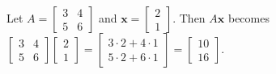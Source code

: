 \documentclass[preview]{standalone}
\begin{document}
\begin{center}
Let $A = \begin{bmatrix} 3 & 4 \\ 5 & 6 \end{bmatrix}$ and $\mathbf{x} = \begin{bmatrix} 2 \\ 1 \end{bmatrix}.$ Then $A\mathbf{x}$ becomes \\ $\begin{bmatrix} 3 & 4 \\ 5 & 6 \end{bmatrix} \begin{bmatrix} 2 \\ 1 \end{bmatrix} = \begin{bmatrix} 3\cdot 2 + 4\cdot 1 \\ 5\cdot 2 + 6\cdot 1\end{bmatrix} = \begin{bmatrix} 10 \\ 16 \end{bmatrix}.$
\end{center}
\end{document}
